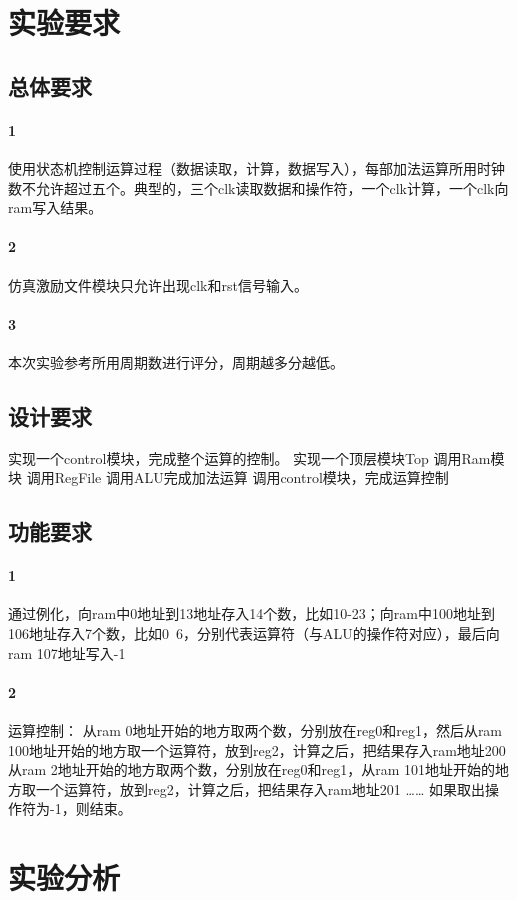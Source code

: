 \documentclass[UTF8]{ctexart}
\begin{document}
\section{实验要求}
\subsection{总体要求}
\paragraph{1}使用状态机控制运算过程（数据读取，计算，数据写入），每部加法运算所用时钟数不允许超过五个。典型的，三个clk读取数据和操作符，一个clk计算，一个clk向ram写入结果。
\paragraph{2}仿真激励文件模块只允许出现clk和rst信号输入。
\paragraph{3}本次实验参考所用周期数进行评分，周期越多分越低。

\subsection{设计要求}
实现一个control模块，完成整个运算的控制。
实现一个顶层模块Top
调用Ram模块
调用RegFile
调用ALU完成加法运算
调用control模块，完成运算控制

\subsection{功能要求}
\paragraph{1}通过例化，向ram中0地址到13地址存入14个数，比如10-23；向ram中100地址到106地址存入7个数，比如0~6，分别代表运算符（与ALU的操作符对应），最后向ram 107地址写入-1
\paragraph{2}运算控制：
从ram 0地址开始的地方取两个数，分别放在reg0和reg1，然后从ram 100地址开始的地方取一个运算符，放到reg2，计算之后，把结果存入ram地址200
从ram 2地址开始的地方取两个数，分别放在reg0和reg1，从ram 101地址开始的地方取一个运算符，放到reg2，计算之后，把结果存入ram地址201
……
如果取出操作符为-1，则结束。


\section{实验分析}
\end{document}
